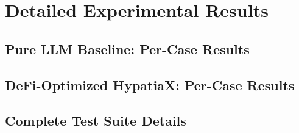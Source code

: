 \documentclass[twoside,11pt]{article}
\begin{document}


\section{Detailed Experimental Results}
\label{app:detailed_results}

\subsection{Pure LLM Baseline: Per-Case Results}



\subsection{DeFi-Optimized HypatiaX: Per-Case Results}



\subsection{Complete Test Suite Details}
\end{document}
